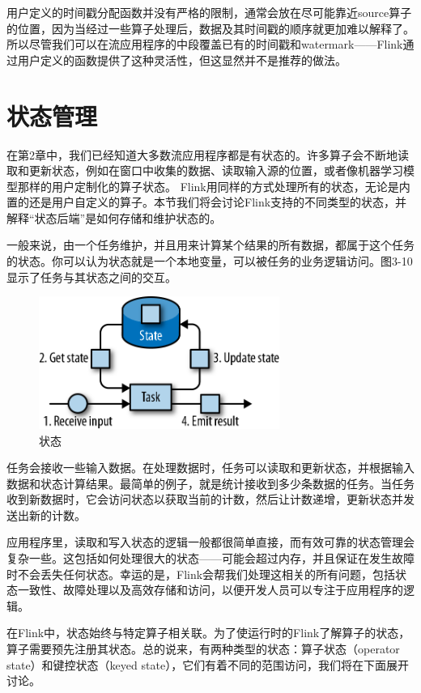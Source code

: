 \documentclass[cn,11pt,chinese]{elegantbook}
\begin{document}
用户定义的时间戳分配函数并没有严格的限制，通常会放在尽可能靠近source算子的位置，因为当经过一些算子处理后，数据及其时间戳的顺序就更加难以解释了。所以尽管我们可以在流应用程序的中段覆盖已有的时间戳和watermark——Flink通过用户定义的函数提供了这种灵活性，但这显然并不是推荐的做法。

\section{状态管理}

在第2章中，我们已经知道大多数流应用程序都是有状态的。许多算子会不断地读取和更新状态，例如在窗口中收集的数据、读取输入源的位置，或者像机器学习模型那样的用户定制化的算子状态。 Flink用同样的方式处理所有的状态，无论是内置的还是用户自定义的算子。本节我们将会讨论Flink支持的不同类型的状态，并解释“状态后端”是如何存储和维护状态的。

一般来说，由一个任务维护，并且用来计算某个结果的所有数据，都属于这个任务的状态。你可以认为状态就是一个本地变量，可以被任务的业务逻辑访问。图3-10显示了任务与其状态之间的交互。

\begin{figure}[htbp]
    \centering
    \includegraphics[width=0.7\textwidth]{images/spaf_0310.png}
    \caption{状态}
\end{figure}

任务会接收一些输入数据。在处理数据时，任务可以读取和更新状态，并根据输入数据和状态计算结果。最简单的例子，就是统计接收到多少条数据的任务。当任务收到新数据时，它会访问状态以获取当前的计数，然后让计数递增，更新状态并发送出新的计数。

应用程序里，读取和写入状态的逻辑一般都很简单直接，而有效可靠的状态管理会复杂一些。这包括如何处理很大的状态——可能会超过内存，并且保证在发生故障时不会丢失任何状态。幸运的是，Flink会帮我们处理这相关的所有问题，包括状态一致性、故障处理以及高效存储和访问，以便开发人员可以专注于应用程序的逻辑。

在Flink中，状态始终与特定算子相关联。为了使运行时的Flink了解算子的状态，算子需要预先注册其状态。总的说来，有两种类型的状态：算子状态（operator state）和键控状态（keyed state），它们有着不同的范围访问，我们将在下面展开讨论。
\end{document}
